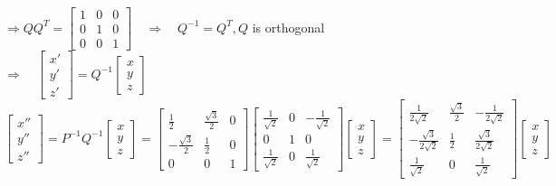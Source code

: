 \documentclass[12pt]{book}
\begin{document}
\begin{CJK}{UTF8}{bsmi}
\begin{minipage}[t]{\dimexpr\linewidth-2em}
$\Rightarrow QQ^T=\begin{bmatrix}
1 & 0 & 0 \\
0 & 1 & 0 \\
0 & 0 & 1
\end{bmatrix}\quad\Rightarrow\quad Q^{-1}=Q^T, Q$ is orthogonal\quad$\Rightarrow\quad\begin{bmatrix}
x' \\ y' \\ z'
\end{bmatrix}=Q^{-1}\begin{bmatrix}
x \\ y \\ z
\end{bmatrix}$ \\
$\begin{bmatrix}
x'' \\ y'' \\ z''
\end{bmatrix}=P^{-1}Q^{-1}\begin{bmatrix}
x \\ y \\ z
\end{bmatrix}=\begin{bmatrix}
\frac{1}{2} &  \frac{\sqrt{3}}{2} & 0 \\
-\frac{\sqrt{3}}{2} & \frac{1}{2} & 0 \\
0    & 0    & 1
\end{bmatrix}\begin{bmatrix}
\frac{1}{\sqrt{2}} & 0 & -\frac{1}{\sqrt{2}} \\
0 & 1 & 0 \\
\frac{1}{\sqrt{2}} & 0 &  \frac{1}{\sqrt{2}}
\end{bmatrix}\begin{bmatrix}
x \\ y \\ z
\end{bmatrix}=\begin{bmatrix}
\frac{1}{2\sqrt{2}} & \frac{\sqrt{3}}{2} & -\frac{1}{2\sqrt{2}} \\
-\frac{\sqrt{3}}{2\sqrt{2}} & \frac{1}{2} & \frac{\sqrt{3}}{2\sqrt{2}} \\
\frac{1}{\sqrt{2}} & 0 &  \frac{1}{\sqrt{2}}
\end{bmatrix}\begin{bmatrix}
x \\ y \\ z
\end{bmatrix}$
\end{minipage}\\


\end{CJK}
\end{document}
